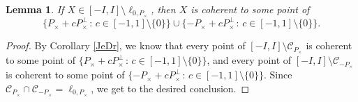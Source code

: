 \documentclass[10pt]{amsart}
\newtheorem{lemma}[theorem]{Lemma}
\theoremstyle{definition}
\theoremstyle{remark}
\numberwithin{subsection}{section}
\numberwithin{equation}{section}
\newcommand\cC{{\mathcal{C}}}
\begin{document}
\begin{lemma}\label{mukpuk}
If $X \in [-I,  I] \setminus \ell_{0, P_\times}$, then $X$ is coherent to some point of 
\[
\{P_\times + cP_\times^\perp\,:\, c\in [-1,1]\setminus\{0\}\}\cup \{-P_\times + cP_\times^\perp\,:\, c\in [-1,1]\setminus\{0\}\}.
\] 
\end{lemma}
\begin{proof}
By Corollary \ref{JeDr}, we know that every point of $[-I, I]\setminus \cC_{P_\times}$ is coherent to some point of $\{P_\times + cP_\times^\perp\,:\, c\in [-1,1]\setminus\{0\}\}$, and every point of $[-I, I]\setminus \cC_{-P_\times}$ is coherent to some point of $\{-P_\times + cP_\times^\perp\,:\, c\in [-1,1]\setminus\{0\}\}$. 
Since $\cC_{P_\times}\cap \cC_{-P_\times}=\ell_{0, P_\times}$, we get to the desired conclusion.
\end{proof}
\end{document}
